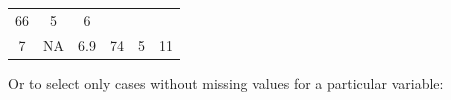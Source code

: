 \documentclass[]{article}
\newenvironment{Shaded}{\begin{snugshade}}{\end{snugshade}}
\newcommand{\KeywordTok}[1]{\textcolor[rgb]{0.13,0.29,0.53}{\textbf{#1}}}
\newcommand{\DecValTok}[1]{\textcolor[rgb]{0.00,0.00,0.81}{#1}}
\newcommand{\StringTok}[1]{\textcolor[rgb]{0.31,0.60,0.02}{#1}}
\newcommand{\OperatorTok}[1]{\textcolor[rgb]{0.81,0.36,0.00}{\textbf{#1}}}
\newcommand{\NormalTok}[1]{#1}
\theoremstyle{definition}
\theoremstyle{definition}
\theoremstyle{definition}
\theoremstyle{remark}
\begin{document}
\begin{longtable}[]{@{}cccccc@{}}
\begin{minipage}[t]{0.08\columnwidth}
66\strut
\end{minipage} & \begin{minipage}[t]{0.09\columnwidth}\centering\strut
5\strut
\end{minipage} & \begin{minipage}[t]{0.06\columnwidth}\centering\strut
6\strut
\end{minipage}\tabularnewline
\begin{minipage}[t]{0.09\columnwidth}\centering\strut
7\strut
\end{minipage} & \begin{minipage}[t]{0.12\columnwidth}\centering\strut
NA\strut
\end{minipage} & \begin{minipage}[t]{0.08\columnwidth}\centering\strut
6.9\strut
\end{minipage} & \begin{minipage}[t]{0.08\columnwidth}\centering\strut
74\strut
\end{minipage} & \begin{minipage}[t]{0.09\columnwidth}\centering\strut
5\strut
\end{minipage} & \begin{minipage}[t]{0.06\columnwidth}\centering\strut
11\strut
\end{minipage}\tabularnewline
\bottomrule
\end{longtable}

Or to select only cases without missing values for a particular
variable:

\begin{Shaded}
\end{Shaded}
\end{document}
